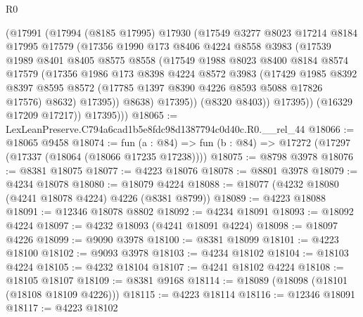 \begin{lexlean}{R0}
\begin{coremodule}
              (@17991
                (@17994
                  (@8185 @17995)
                  @17930
                  (@17549
                    @3277
                    @8023
                    @17214
                    @8184
                    @17995
                    @17579
                    (@17356
                      @1990
                      @173
                      @8406
                      @4224
                      @8558
                      @3983
                      (@17539
                        @1989
                        @8401
                        @8405
                        @8575
                        @8558
                        (@17549
                          @1988
                          @8023
                          @8400
                          @8184
                          @8574
                          @17579
                          (@17356
                            @1986
                            @173
                            @8398
                            @4224
                            @8572
                            @3983
                            (@17429
                              @1985
                              @8392
                              @8397
                              @8595
                              @8572
                              (@17785 @1397 @8390 @4226 @8593 @5088 @17826 @17576)
                              @8632)
                            @17395))
                        @8638)
                      @17395))
                  (@8320 @8403))
                @17395))
            (@16329 @17209 @17217))
          @17395)))
@18065 := LexLeanPreserve.C794a6cad1b5e8fdc98d1387794c0d40c.R0.__rel_44
@18066 := @18065 @9458
@18074 := fun (a : @84) => fun (b : @84) => @17272 (@17297 (@17337 (@18064 (@18066 @17235 @17238))))
@18075 := @8798 @3978
@18076 := @8381 @18075
@18077 := @4223 @18076
@18078 := @8801 @3978
@18079 := @4234 @18078
@18080 := @18079 @4224
@18088 := @18077 (@4232 @18080 (@4241 @18078 @4224) @4226 (@8381 @8799))
@18089 := @4223 @18088
@18091 := @12346 @18078 @8802
@18092 := @4234 @18091
@18093 := @18092 @4224
@18097 := @4232 @18093 (@4241 @18091 @4224)
@18098 := @18097 @4226
@18099 := @9090 @3978
@18100 := @8381 @18099
@18101 := @4223 @18100
@18102 := @9093 @3978
@18103 := @4234 @18102
@18104 := @18103 @4224
@18105 := @4232 @18104
@18107 := @4241 @18102 @4224
@18108 := @18105 @18107
@18109 := @8381 @9168
@18114 := @18089 (@18098 (@18101 (@18108 @18109 @4226)))
@18115 := @4223 @18114
@18116 := @12346 @18091
@18117 := @4223 @18102

\end{coremodule}
\end{lexlean}
